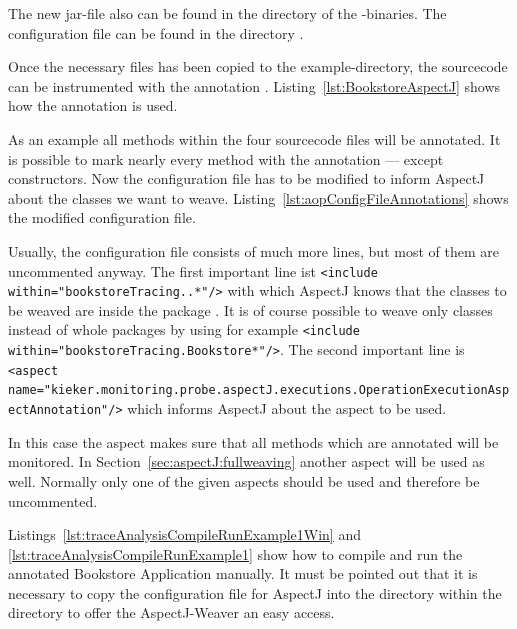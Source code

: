 \noindent The new jar-file  also can be found
in the  directory of the \Kieker{}-binaries. The
configuration file \file{\aopConfigFile} can be found in the directory .

Once the necessary files has been copied to the example-directory,
the sourcecode can be instrumented with the annotation .
Listing~\ref{lst:BookstoreAspectJ} shows how the annotation is
used.

\setJavaCodeListing


As an example all methods within the four sourcecode files will be
annotated. It is possible to mark nearly every method with the annotation
--- except constructors. Now the configuration file has to be modified to inform AspectJ about the classes we want to weave. Listing~\ref{lst:aopConfigFileAnnotations} shows the modified configuration file.
\setXMLListing

Usually, the configuration file consists of much more lines, but most of them are uncommented anyway. The first important line ist 
\lstinline$<include within="bookstoreTracing..*"/>$
with which AspectJ knows that the classes to be weaved are inside the package . It is of course possible to weave only classes instead of whole packages by using for example 
\lstinline$<include within="bookstoreTracing.Bookstore*"/>$. The second important line is 
\lstinline$<aspect name="kieker.monitoring.probe.aspectJ.executions.OperationExecutionAspectAnnotation"/>$ which informs AspectJ about the aspect to be used.

In this case the aspect makes sure that all methods which are annotated will be monitored. In Section~\ref{sec:aspectJ:fullweaving} another aspect will be used as well. Normally only one of the given aspects should be used and therefore be uncommented.

Listings~\ref{lst:traceAnalysisCompileRunExample1Win} and \ref{lst:traceAnalysisCompileRunExample1} show how to compile and run the annotated Bookstore Application manually. It must be pointed out that it is necessary to copy the configuration file for AspectJ into the  directory within the  directory to offer the AspectJ-Weaver an easy access.

